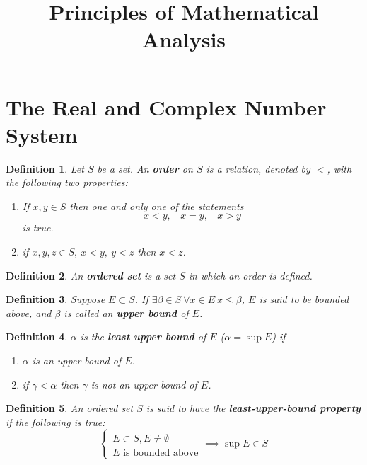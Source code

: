 \documentclass[aps,pra,onecolumn,notitlepage,superscriptaddress]{revtex4-1}
\newtheorem{defi}{Definition}
\begin{document}
    \title{Principles of Mathematical Analysis}
    \author{}
    \maketitle

    \section{The Real and Complex Number System}
    \begin{defi}
        Let $S$ be a set. An \textbf{order} on $S$ is a relation, denoted by $<$, with the following two properties:
        \begin{enumerate}
            \item If $x, y \in S$ then one and only one of the statements
            \begin{equation}
                x < y, \ \ \ \ x = y, \ \ \ \ x > y
            \end{equation}
            is true.
            \item if $x,y,z \in S, \ x < y, \ y < z$ then $x < z$.
        \end{enumerate}
    \end{defi} 

    \begin{defi}
        An \textbf{ordered set} is a set $S$ in which an order is defined.
    \end{defi}
    \begin{defi}
        Suppose $E \subset S$. If $\exists \beta \in S \ \forall x \in E \ x \leq \beta$, $E$ is said to be bounded above, and $\beta$ is called an \textbf{upper bound} of $E$.
    \end{defi}
    \begin{defi}
        $\alpha$ is the \textbf{least upper bound} of $E$ ($\alpha = \sup E$) if
        \begin{enumerate}
            \item $\alpha$ is an upper bound of $E$.
            \item if $\gamma < \alpha$ then $\gamma$ is not an upper bound of $E$.
        \end{enumerate}
    \end{defi}
    \begin{defi}
        An ordered set $S$ is said to have the \textbf{least-upper-bound property} if the following is true:
        \begin{equation*}
            \begin{cases}
                E \subset S, E \neq \emptyset \\
                E \text{ is bounded above}
            \end{cases}
            \implies
            \sup E \in S
        \end{equation*}
    \end{defi}
\end{document}
